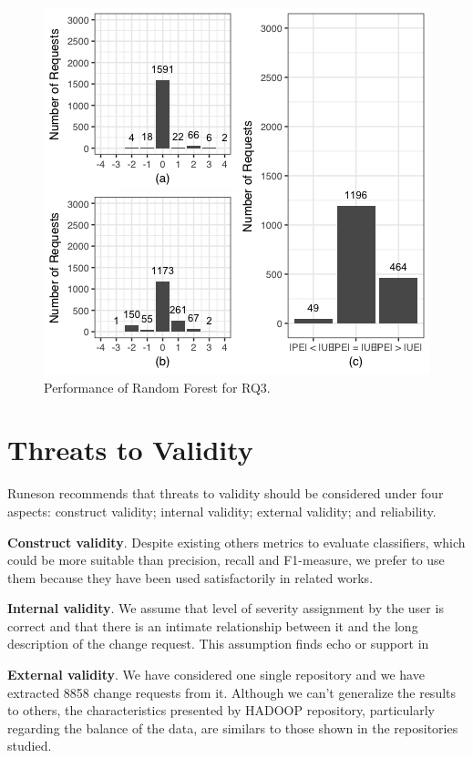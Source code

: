 \documentclass[10pt, conference]{IEEEtran}
\begin{document}
\begin{figure}[!hbt]
  \center
  \label{fig:rf_performance_for_q3}
  \includegraphics[scale=0.60]{figures/graphic_performance_q3_a.png}
  \caption{Performance of Random Forest for RQ3.}
\end{figure}


\section{Threats to Validity}
Runeson \cite{Runeson2009} recommends that threats to validity should be considered under four aspects: construct validity;  internal validity; external validity; and reliability.

\textbf{Construct validity}. Despite existing others metrics to evaluate classifiers\cite{Facelli2015}, which could be more suitable than precision, recall and F1-measure, we prefer to use them because they have been used satisfactorily in related works\cite{Menzies2008, Lamkanfi2010, Lamkanfi2011, ValdiviaGarcia2014}.


\textbf{Internal validity}. We assume that level of severity assignment by the user is correct and that there is an intimate relationship between it and the long description of the change request. This assumption finds echo or support in \cite{Lamkanfi2010, Tian2012}

\textbf{External validity}. We have considered one single repository and we have extracted 8858 change requests from it. Although we can't generalize the results to others, the characteristics presented by HADOOP repository, particularly regarding the balance of the data, are similars to those shown in the repositories studied\cite{Lamkanfi2010, Lamkanfi2011, Tian2012,ValdiviaGarcia2014}.
\end{document}
